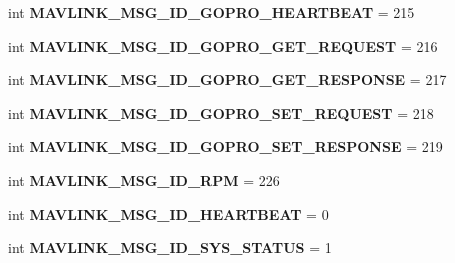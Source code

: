 \begin{DoxyCompactItemize}
\item 
\mbox{\label{namespacepymavlink_1_1dialects_1_1v10_a7bcf076ed50fde9e4d284a85f292c1d3}} 
int {\bfseries M\+A\+V\+L\+I\+N\+K\+\_\+\+M\+S\+G\+\_\+\+I\+D\+\_\+\+G\+O\+P\+R\+O\+\_\+\+H\+E\+A\+R\+T\+B\+E\+AT} = 215
\item 
\mbox{\label{namespacepymavlink_1_1dialects_1_1v10_a806aeb755fd2644373e46f65206f4382}} 
int {\bfseries M\+A\+V\+L\+I\+N\+K\+\_\+\+M\+S\+G\+\_\+\+I\+D\+\_\+\+G\+O\+P\+R\+O\+\_\+\+G\+E\+T\+\_\+\+R\+E\+Q\+U\+E\+ST} = 216
\item 
\mbox{\label{namespacepymavlink_1_1dialects_1_1v10_a7ba6c8008b99657ce5cb2b61cc91b34a}} 
int {\bfseries M\+A\+V\+L\+I\+N\+K\+\_\+\+M\+S\+G\+\_\+\+I\+D\+\_\+\+G\+O\+P\+R\+O\+\_\+\+G\+E\+T\+\_\+\+R\+E\+S\+P\+O\+N\+SE} = 217
\item 
\mbox{\label{namespacepymavlink_1_1dialects_1_1v10_a14781330e4ed398f29ffb02303a638ba}} 
int {\bfseries M\+A\+V\+L\+I\+N\+K\+\_\+\+M\+S\+G\+\_\+\+I\+D\+\_\+\+G\+O\+P\+R\+O\+\_\+\+S\+E\+T\+\_\+\+R\+E\+Q\+U\+E\+ST} = 218
\item 
\mbox{\label{namespacepymavlink_1_1dialects_1_1v10_abc628c60474c7c928ef25a50a946bcb6}} 
int {\bfseries M\+A\+V\+L\+I\+N\+K\+\_\+\+M\+S\+G\+\_\+\+I\+D\+\_\+\+G\+O\+P\+R\+O\+\_\+\+S\+E\+T\+\_\+\+R\+E\+S\+P\+O\+N\+SE} = 219
\item 
\mbox{\label{namespacepymavlink_1_1dialects_1_1v10_aacc2213ba04c8819d3fb8e27cb765fbd}} 
int {\bfseries M\+A\+V\+L\+I\+N\+K\+\_\+\+M\+S\+G\+\_\+\+I\+D\+\_\+\+R\+PM} = 226
\item 
\mbox{\label{namespacepymavlink_1_1dialects_1_1v10_a487261125c689eac48564e143675e8e1}} 
int {\bfseries M\+A\+V\+L\+I\+N\+K\+\_\+\+M\+S\+G\+\_\+\+I\+D\+\_\+\+H\+E\+A\+R\+T\+B\+E\+AT} = 0
\item 
\mbox{\label{namespacepymavlink_1_1dialects_1_1v10_a65075d67c84c7d977534768aeb53337f}} 
int {\bfseries M\+A\+V\+L\+I\+N\+K\+\_\+\+M\+S\+G\+\_\+\+I\+D\+\_\+\+S\+Y\+S\+\_\+\+S\+T\+A\+T\+US} = 1

\end{DoxyCompactItemize}
